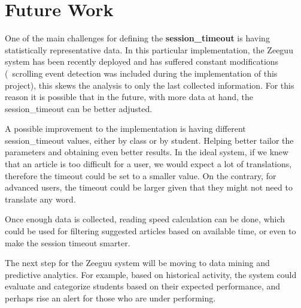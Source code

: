\chapter{Future Work}\label{p06:futurework}

One of the main challenges for defining the \textbf{session\_timeout} is having statistically representative data. In this particular implementation, the Zeeguu system has been recently deployed and has suffered constant modifications (\eg\ scrolling event detection was included during the implementation of this project), this skews the analysis to only the last collected information. For this reason it is possible that in the future, with more data at hand, the session\_timeout can be better adjusted.

A possible improvement to the implementation is having different session\_timeout values, either by class or by student. Helping better tailor the parameters and obtaining even better results. In the ideal system, if we knew that an article is too difficult for a user, we would expect a lot of translations, therefore the timeout could be set to a smaller value. On the contrary, for advanced users, the timeout could be larger given that they might not need to translate any word.

Once enough data is collected, reading speed calculation can be done, which could be used for filtering suggested articles based on available time, or even to make the session timeout smarter.

The next step for the Zeeguu system will be moving to data mining and predictive analytics. For example, based on historical activity, the system could evaluate and categorize students based on their expected performance, and perhaps rise an alert for those who are under performing. 

